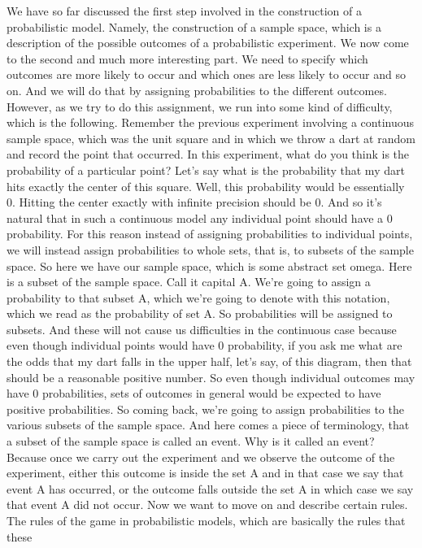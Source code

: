 \documentclass[pdftex, brazil, 12pt, twoside]{article}
\begin{document}
We have so far discussed the first step involved in the
construction of a probabilistic model.
Namely, the construction of a sample space, which is a
description of the possible outcomes of a probabilistic
experiment.
We now come to the second and much more interesting part.
We need to specify which outcomes are more likely to
occur and which ones are less likely to occur and so on.
And we will do that by assigning probabilities to the
different outcomes.
However, as we try to do this assignment, we run into some
kind of difficulty, which is the following.
Remember the previous experiment involving a
continuous sample space, which was the unit square and in
which we throw a dart at random and record the point
that occurred.
In this experiment, what do you think is the probability
of a particular point?
Let's say what is the probability that my dart hits
exactly the center of this square.
Well, this probability would be essentially 0.
Hitting the center exactly with infinite
precision should be 0.
And so it's natural that in such a continuous model any
individual point should have a 0 probability.
For this reason instead of assigning probabilities to
individual points, we will instead assign probabilities
to whole sets, that is, to subsets of the sample space.
So here we have our sample space, which is some
abstract set omega.
Here is a subset of the sample space.
Call it capital A. We're going to assign a probability to
that subset A, which we're going to denote with this
notation, which we read as the probability of set A. So
probabilities will be assigned to subsets.
And these will not cause us difficulties in the continuous
case because even though individual points would have 0
probability, if you ask me what are the odds that my dart
falls in the upper half, let's say, of this diagram, then
that should be a reasonable positive number.
So even though individual outcomes may have 0
probabilities, sets of outcomes in general would be
expected to have positive probabilities.
So coming back, we're going to assign probabilities to the
various subsets of the sample space.
And here comes a piece of terminology, that a subset of
the sample space is called an event.
Why is it called an event?
Because once we carry out the experiment and we observe the
outcome of the experiment, either this outcome is inside
the set A and in that case we say that event A has occurred,
or the outcome falls outside the set A in which case we say
that event A did not occur.
Now we want to move on and describe certain rules.
The rules of the game in probabilistic models, which
are basically the rules that these
\end{document}
